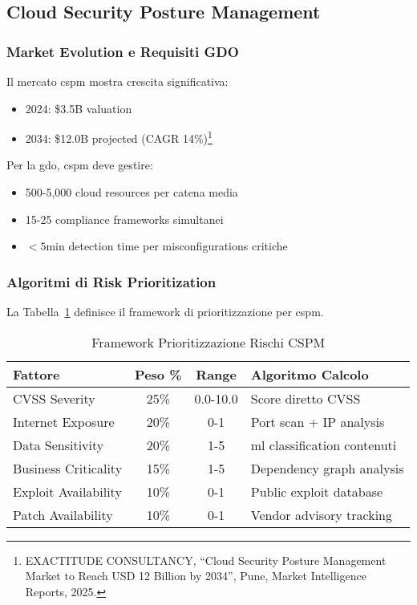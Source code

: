 \subsection{Cloud Security Posture Management}
\label{subsec:cspm}

\subsubsection{Market Evolution e Requisiti GDO}

Il mercato \gls{cspm} mostra crescita significativa:
\begin{itemize}
    \item 2024: \$3.5B valuation
    \item 2034: \$12.0B projected (CAGR 14\%)\footnote{EXACTITUDE CONSULTANCY, ``Cloud Security Posture Management Market to Reach USD 12 Billion by 2034'', Pune, Market Intelligence Reports, 2025.}
\end{itemize}

Per la \gls{gdo}, \gls{cspm} deve gestire:
\begin{itemize}
    \item 500-5,000 cloud resources per catena media
    \item 15-25 compliance frameworks simultanei
    \item $<5$min detection time per misconfigurations critiche
\end{itemize}

\subsubsection{Algoritmi di Risk Prioritization}

La Tabella~\ref{tab:framework-prioritizzazione-rischi} definisce il framework di prioritizzazione per \gls{cspm}.

\begin{table}[htbp]
\centering
\caption{Framework Prioritizzazione Rischi CSPM}
\label{tab:framework-prioritizzazione-rischi}
\begin{tabular}{|l|c|c|l|}
\hline
\textbf{Fattore} & \textbf{Peso \%} & \textbf{Range} & \textbf{Algoritmo Calcolo} \\
\hline
CVSS Severity & 25\% & 0.0-10.0 & Score diretto CVSS \\
\hline
Internet Exposure & 20\% & 0-1 & Port scan + IP analysis \\
\hline
Data Sensitivity & 20\% & 1-5 & \gls{ml} classification contenuti \\
\hline
Business Criticality & 15\% & 1-5 & Dependency graph analysis \\
\hline
Exploit Availability & 10\% & 0-1 & Public exploit database \\
\hline
Patch Availability & 10\% & 0-1 & Vendor advisory tracking \\
\hline
\end{tabular}
\end{table}

